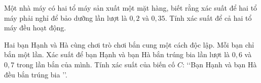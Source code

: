 \begin{bt}%
	Một nhà máy có hai tổ máy sản xuất một mặt hàng, biết rằng xác suất để hai tổ máy phải nghỉ để bảo dưỡng lần lượt là $0{,}2$ và $0{,}35$. Tính xác suất để cả hai tổ máy đều hoạt động. 
\end{bt}

\begin{bt}%
	Hai bạn Hạnh và Hà cùng chơi trò chơi bắn cung một cách độc lập. Mỗi bạn chỉ bắn một lần. Xác suất để bạn Hạnh và bạn Hà bắn trúng bia lần lượt là $0{,}6$ và $0{,}7$ trong lần bắn của mình. Tính xác suất của biến cố $C$: \lq\lq Bạn Hạnh và bạn Hà đều bắn trúng bia \rq\rq.
\end{bt}

